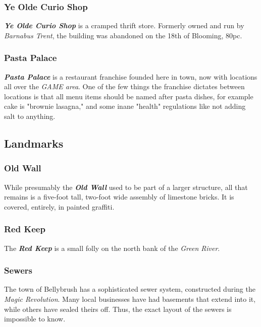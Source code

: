 \documentclass[11pt]{teraum_adventure}
\begin{document}
\subsubsection*{Ye Olde Curio Shop}
\label{sec:org44fe0ab}
\textbf{\emph{Ye Olde Curio Shop}} is a cramped thrift store. Formerly owned and
run by \emph{Barnabus Trent}, the building was abandoned on the 18th of
Blooming, 80pc.
\subsubsection*{Pasta Palace}
\label{sec:org3e5f56d}
\textbf{\emph{Pasta Palace}} is a restaurant franchise founded here in town, now
with locations all over the \emph{GAME area}. One of the few things the
franchise dictates between locations is that all menu items should be
named after pasta dishes, for example cake is "brownie lasagna," and
some inane "health" regulations like not adding salt to anything.

\subsection*{Landmarks}
\label{sec:org9269f2e}
\subsubsection*{Old Wall}
\label{sec:org721d7f9}
While presumably the \textbf{\emph{Old Wall}} used to be part of a larger
structure, all that remains is a five-foot tall, two-foot wide
assembly of limestone bricks. It is covered, entirely, in painted
graffiti.
\subsubsection*{Red Keep}
\label{sec:orgef9c11c}
The \textbf{\emph{Red Keep}} is a small folly on the north bank of the \emph{Green River}.
\subsubsection*{Sewers}
\label{sec:org449d4a6}
The town of Bellybrush has a sophisticated sewer system, constructed
during the \emph{Magic Revolution}. Many local businesses have had
basements that extend into it, while others have sealed theirs off.
Thus, the exact layout of the sewers is impossible to know.
\end{document}
